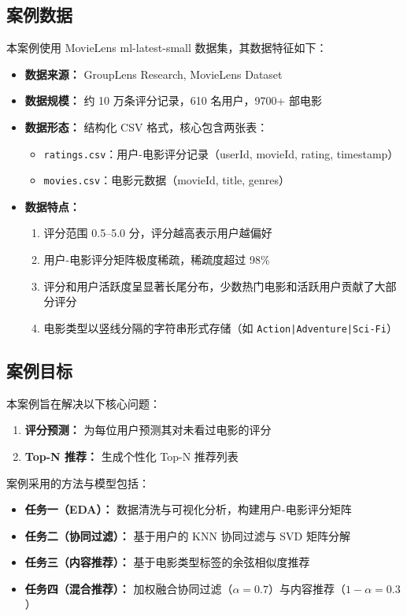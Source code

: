 \documentclass[12pt,a4paper]{ctexart}
\begin{document}
\subsection{案例数据}

本案例使用 MovieLens ml-latest-small 数据集，其数据特征如下：

\begin{itemize}[leftmargin=*]
    \item \textbf{数据来源：} GroupLens Research, MovieLens Dataset \cite{harper2015movielens}
    \item \textbf{数据规模：} 约 10 万条评分记录，610 名用户，9700+ 部电影
    \item \textbf{数据形态：} 结构化 CSV 格式，核心包含两张表：
    \begin{itemize}
        \item \texttt{ratings.csv}：用户-电影评分记录（userId, movieId, rating, timestamp）
        \item \texttt{movies.csv}：电影元数据（movieId, title, genres）
    \end{itemize}
    \item \textbf{数据特点：}
    \begin{enumerate}[label=(\arabic*), leftmargin=*]
        \item 评分范围 0.5--5.0 分，评分越高表示用户越偏好
        \item 用户-电影评分矩阵极度稀疏，稀疏度超过 98\%
        \item 评分和用户活跃度呈显著长尾分布，少数热门电影和活跃用户贡献了大部分评分
        \item 电影类型以竖线分隔的字符串形式存储（如 \texttt{Action|Adventure|Sci-Fi}）
    \end{enumerate}
\end{itemize}

\subsection{案例目标}

本案例旨在解决以下核心问题：
\begin{enumerate}[label=(\arabic*), leftmargin=*]
    \item \textbf{评分预测：} 为每位用户预测其对未看过电影的评分
    \item \textbf{Top-N 推荐：} 生成个性化 Top-N 推荐列表
\end{enumerate}

案例采用的方法与模型包括：
\begin{itemize}[leftmargin=*]
    \item \textbf{任务一（EDA）：} 数据清洗与可视化分析，构建用户-电影评分矩阵
    \item \textbf{任务二（协同过滤）：} 基于用户的 KNN 协同过滤与 SVD 矩阵分解
    \item \textbf{任务三（内容推荐）：} 基于电影类型标签的余弦相似度推荐
    \item \textbf{任务四（混合推荐）：} 加权融合协同过滤（$\alpha=0.7$）与内容推荐（$1-\alpha=0.3$）
\end{itemize}
\end{document}
